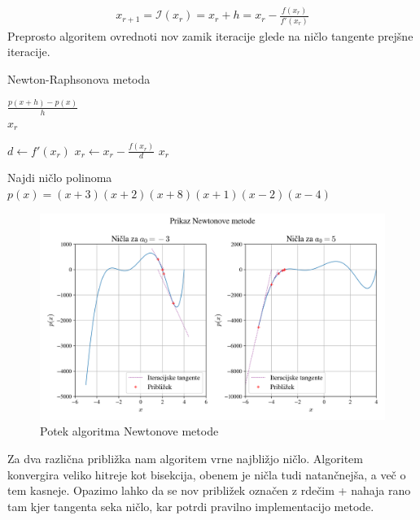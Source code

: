 \begin{align}
    x_{r+1} = \mathcal{I}(x_{r}) = x_{r} + h =  x_{r} - \frac{f(x_r)}{f'(x_r)}
\end{align}
Preprosto algoritem ovrednoti nov zamik iteracije glede na ničlo tangente prejšne iteracije.
\begin{algorithm}[H]
\caption{Newton-Raphsonova metoda}
\begin{algorithmic}



 
    \State \Return $\frac{p(x + h) - p(x)}{h}$ 
\EndProcedure\\
\Require $x_r$

 
    \State $d \gets f'(x_r)$ 
    \State $x_r \gets x_r - \frac{f(x_r)}{d}$
\EndWhile 
\State  \Return $x_r$
\EndProcedure
\end{algorithmic}
\end{algorithm}
\newpage
\begin{primer}
    Najdi ničlo polinoma $p(x) = (x+3)(x+2)(x+8)(x+1)(x-2)(x-4)$
    \begin{figure}[H]
    \centering
    \includegraphics[width=1\textwidth]{img/newton.png}
    \caption{Potek algoritma Newtonove metode}
    \label{fig:newtons}
\end{figure}
    Za dva različna približka nam algoritem vrne najbližjo ničlo. Algoritem konvergira veliko hitreje kot bisekcija, obenem je  ničla tudi natančnejša, a več o tem kasneje. Opazimo lahko da se nov približek označen z rdečim + nahaja rano tam kjer tangenta seka ničlo, kar potrdi pravilno implementacijo metode.
\end{primer}
